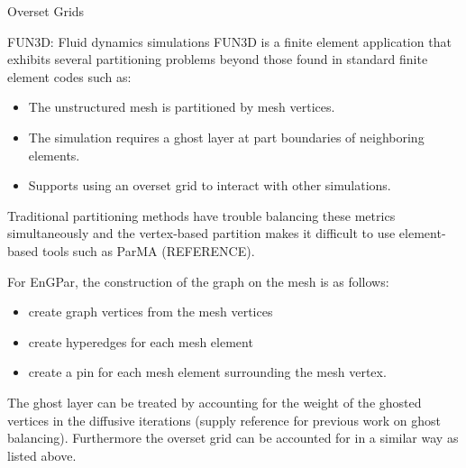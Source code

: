 \documentclass{beamer}
\begin{document}
\begin{textblock}{15.6}
\begin{textblock}{5}
\begin{block}{Overset Grids}
      
    \end{block}
    
    \begin{block}{FUN3D: Fluid dynamics simulations}
      FUN3D is a finite element application that exhibits several partitioning problems beyond those found in standard finite element codes such as:
      \begin{itemize}
      \item The unstructured mesh is partitioned by mesh vertices.
      \item The simulation requires a ghost layer at part boundaries of neighboring elements.
      \item Supports using an overset grid to interact with other simulations.
      \end{itemize}

      Traditional partitioning methods have trouble balancing these metrics simultaneously and the vertex-based partition makes it difficult to use element-based tools such as ParMA (REFERENCE).


      For EnGPar, the construction of the graph on the mesh is as follows:
      \begin{itemize}
      \item create graph vertices from the mesh vertices
      \item create hyperedges for each mesh element
      \item create a pin for each mesh element surrounding the mesh vertex.
      \end{itemize}

      The ghost layer can be treated by accounting for the weight of the ghosted vertices in the diffusive iterations (supply reference for previous work on ghost balancing). Furthermore the overset grid can be accounted for in a similar way as listed above.

      
    \end{block}
  \end{textblock}
\end{textblock}
\end{document}
